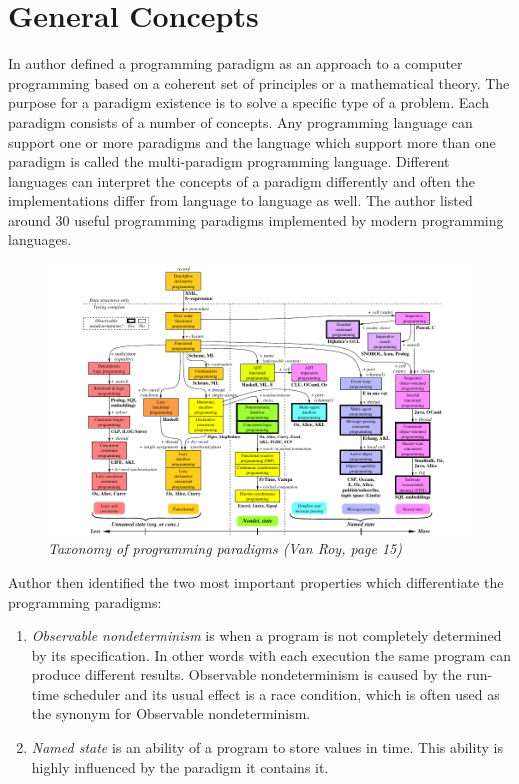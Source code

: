 \documentclass[12pt,twoside,a4paper]{report}
\begin{document}
\section{General Concepts}
In \cite{12} author defined a programming paradigm as an approach to a computer programming based on a coherent set of principles or a mathematical theory. The purpose for a paradigm existence is to solve a specific type of a problem. Each paradigm consists of a number of concepts. Any programming language can support one or more paradigms and the language which support more than one paradigm is called the multi-paradigm programming language. Different languages can interpret the concepts of a paradigm differently and often the implementations differ from language to language as well. The author listed around 30 useful programming paradigms implemented by modern programming languages.

\begin{figure}[!hb]
	\centering
		\includegraphics[width=1\textwidth,totalheight=12cm]{taxonomyDiagram}
	\caption{\textit{Taxonomy of programming paradigms (Van Roy, page 15)}}
\end{figure}

Author then identified the two most important properties which differentiate the programming paradigms:

\begin{enumerate}
\item \textit{Observable nondeterminism} is when a program is not completely determined by its specification. In other words with each execution the same program can produce different results. Observable nondeterminism is caused by the run-time scheduler and its usual effect is a race condition, which is often used as the synonym for Observable nondeterminism.
\item \textit{Named state} is an ability of a program to store values in time. This ability is highly influenced by the paradigm it contains it.
\end{enumerate}
\end{document}
